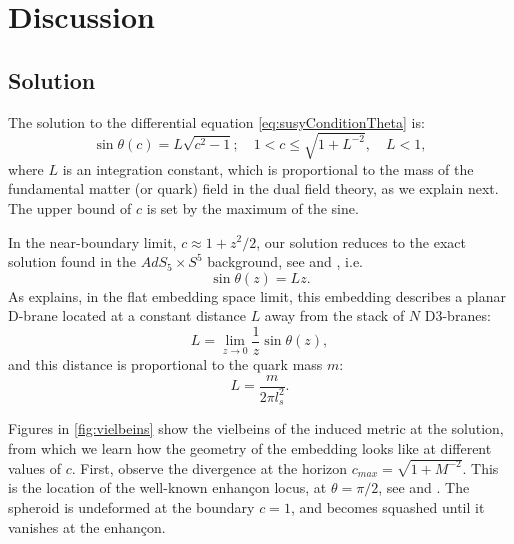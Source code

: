 \section{Discussion}\label{sec:discussion}

\subsection{Solution}

The solution to the differential equation \eqref{eq:susyConditionTheta} is:
\begin{equation}\label{eq:susyConditionSolution}
\boxed{\sin\theta(c) = L \sqrt{c^2-1}; \quad 1 < c \leq \sqrt{1+L^{-2}}, \quad L < 1},
\end{equation}
where $L$ is an integration constant, which is proportional to the mass of the fundamental matter (or quark) field in the dual field theory, as we explain next. The upper bound of $c$ is set by the maximum of the sine.

In the near-boundary limit, $c \approx 1 + z^2/2$, our solution reduces to the exact solution found in the $AdS_5 \times S^5$ background, see \cite{Karch:2002sh} and \cite{Karch:2005ms}, i.e.
\begin{equation}
 \sin\theta(z) = L z.
\end{equation}
As \cite{Karch:2005ms} explains, in the flat embedding space limit, this embedding describes a planar D-brane located at a constant distance $L$ away from the stack of $N$ D3-branes:
\begin{equation}
 L = \lim_{z \rightarrow 0 } \frac{1}{z} \sin\theta(z),
\end{equation}
and this distance is proportional to the quark mass $m$:
\begin{equation}
 L = \dfrac{m}{2 \pi l_s^2}.
\end{equation}


Figures in \ref{fig:vielbeins} show the vielbeins of the induced metric at the solution, from which we learn how the geometry of the embedding looks like at different values of $c$. First, observe the divergence at the horizon $c_{max}=\sqrt{1+M^{-2}}$. This is the location of the well-known enhançon locus, at $\theta = \pi/2$, see \cite{Buchel:2000cn} and \cite{Evans:2000ct}. The spheroid is undeformed at the boundary $c=1$, and becomes squashed until it vanishes at the enhançon. 

